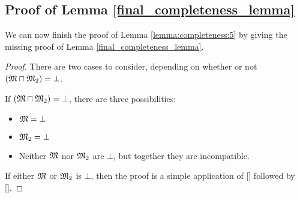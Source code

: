 \subsection{Proof of Lemma \ref{final_completeness_lemma}}
\label{prooflemma6}

We can now finish the proof of Lemma \ref{lemma:completeness:5} by
giving the missing proof of Lemma \ref{final_completeness_lemma}.

\begin{proof}
There are two cases to consider, depending on whether or not $(\frak{M}
\sqcap \frak{M}_2) = \bot$.


If $(\frak{M} \sqcap \frak{M}_2) = \bot$, there are three possibilities:
\begin{itemize}
\item
$\frak{M} = \bot$
\item
$\frak{M}_2 = \bot$
\item
Neither $\frak{M}$ nor $\frak{M}_2$ are $\bot$, but together they are incompatible. 
\end{itemize}
If either $\frak{M}$ or $\frak{M}_2$ is $\bot$, then the proof is a simple application of [] followed by [].


\end{proof}
